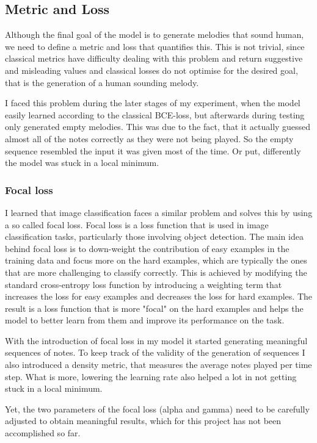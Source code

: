 \documentclass[a4paper, 10pt, xcolor=dvipsnames]{article} %
\begin{document}
\subsection{Metric and Loss}
Although the final goal of the model is to generate melodies that sound human,
we need to define a metric and loss that quantifies this. This is not trivial,
since classical metrics have difficulty dealing with this problem and return
suggestive and misleading values and classical losses do not optimise for the
desired goal, that is the generation of a human sounding melody.

I faced this problem during the later stages of my experiment, when the model
easily learned according to the classical BCE-loss, but afterwards during
testing only generated empty melodies. This was due to the fact, that it
actually guessed almost all of the notes correctly as they were not being
played. So the empty sequence resembled the input it was given most of the
time. Or put, differently the model was stuck in a local minimum.

\subsubsection{Focal loss}

I learned that image classification faces a similar problem and solves this by
using a so called focal loss. Focal loss is a loss function that is used in
image classification tasks, particularly those involving object detection. The
main idea behind focal loss is to down-weight the contribution of easy examples
in the training data and focus more on the hard examples, which are typically
the ones that are more challenging to classify correctly. This is achieved by
modifying the standard cross-entropy loss function by introducing a weighting
term that increases the loss for easy examples and decreases the loss for hard
examples. The result is a loss function that is more "focal" on the hard
examples and helps the model to better learn from them and improve its
performance on the task.

With the introduction of focal loss in my model it started generating
meaningful sequences of notes. To keep track of the validity of the generation
of sequences I also introduced a density metric, that measures the average
notes played per time step. What is more, lowering the learning rate also
helped a lot in not getting stuck in a local minimum.

Yet, the two parameters of the focal loss (alpha and gamma) need to be
carefully adjusted to obtain meaningful results, which for this project has not
been accomplished so far.
\end{document}
